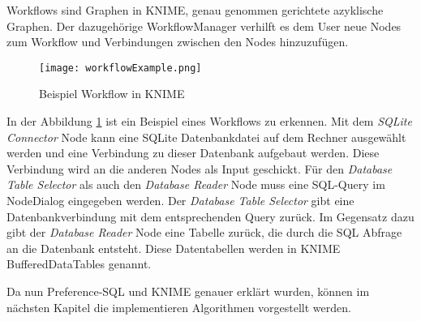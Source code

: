 Workflows sind Graphen in KNIME, genau genommen gerichtete azyklische Graphen. Der dazugehörige WorkflowManager verhilft es dem User neue Nodes zum Workflow und Verbindungen zwischen den Nodes hinzuzufügen.

\begin{figure}[H]
	\centering
	\texttt{[image: workflowExample.png]}
	\caption{Beispiel Workflow in KNIME}
	\label{img:workflowExample}
\end{figure}

In der Abbildung \ref{img:workflowExample} ist ein Beispiel eines Workflows zu erkennen. Mit dem \textit{SQLite Connector} Node kann eine SQLite Datenbankdatei auf dem Rechner ausgewählt werden und eine Verbindung zu dieser Datenbank aufgebaut werden. Diese Verbindung wird an die anderen Nodes als Input geschickt. Für den \textit{Database Table Selector} als auch den \textit{Database Reader} Node muss eine SQL-Query im NodeDialog eingegeben werden. Der \textit{Database Table Selector} gibt eine Datenbankverbindung mit dem entsprechenden Query zurück. Im Gegensatz dazu gibt der \textit{Database Reader} Node eine Tabelle zurück, die durch die SQL Abfrage an die Datenbank entsteht. Diese Datentabellen werden in KNIME BufferedDataTables genannt. 

Da nun Preference-SQL und KNIME genauer erklärt wurden, können im nächsten Kapitel die implementieren Algorithmen vorgestellt werden.
